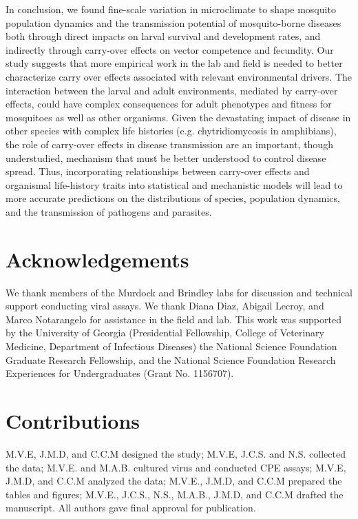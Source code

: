 \documentclass[12pt]{article}
\begin{document}
In conclusion, we found fine-scale variation in microclimate to shape mosquito population dynamics and the transmission potential of mosquito-borne diseases both through direct impacts on larval survival and development rates, and indirectly through carry-over effects on vector competence and fecundity. Our study suggests that more empirical work in the lab and field is needed to better characterize carry over effects associated with relevant environmental drivers. The interaction between the larval and adult environments, mediated by carry-over effects, could have complex consequences for adult phenotypes and fitness for mosquitoes as well as other organisms. Given the devastating impact of disease in other species with complex life histories (e.g. chytridiomycosis in amphibians), the role of carry-over effects in disease transmission are an important, though understudied, mechanism that must be better understood to control disease spread. Thus, incorporating relationships between carry-over effects and organismal life-history traits into statistical and mechanistic models will lead to more accurate predictions on the distributions of species, population dynamics, and the transmission of pathogens and parasites.

\section{Acknowledgements}
We thank members of the Murdock and Brindley labs for discussion and technical support conducting viral assays. We thank Diana Diaz, Abigail Lecroy, and Marco Notarangelo for assistance in the field and lab. This work was supported by the University of Georgia (Presidential Fellowship, College of Veterinary Medicine, Department of Infectious Diseases) the National Science Foundation Graduate Research Fellowship, and the National Science Foundation Research Experiences for Undergraduates (Grant No. 1156707).

\section{Contributions}
M.V.E, J.M.D, and C.C.M designed the study; M.V.E, J.C.S. and N.S. collected the data; M.V.E. and M.A.B. cultured virus and conducted CPE assays; M.V.E, J.M.D, and C.C.M analyzed the data; M.V.E., J.M.D, and C.C.M prepared the tables and figures; M.V.E., J.C.S., N.S., M.A.B., J.M.D, and C.C.M drafted the manuscript. All authors gave final approval for publication.
\end{document}
